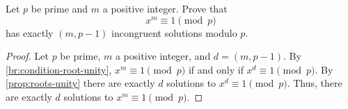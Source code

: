 \documentclass{ximera}
\begin{document}
\begin{br}\label{br:more-roots-unity}
    Let $p$ be prime and $m$ a positive integer. Prove that 
    \[
        x^m\equiv 1\pmod{p}
    \]
    has exactly $(m,p-1)$ incongruent solutions modulo $p.$


    \begin{proof}
        Let $p$ be prime, $m$ a positive integer, and $d=(m,p-1).$ 
        By \autoref{br:condition-root-unity}, $x^m\equiv 1\pmod{p}$ if and only if $x^d\equiv 1\pmod{p}$. By \cref{prop:roots-unity} there are exactly $d$ solutions to $x^d\equiv 1\pmod{p}.$ Thus, there are exactly $d$ solutions to $x^m\equiv 1\pmod{p}.$
    \end{proof}
\end{br}

\end{document}

